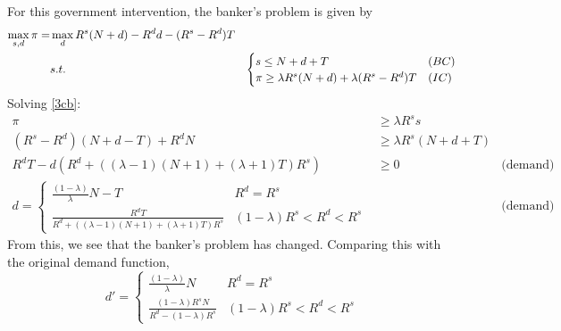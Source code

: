 \documentclass[12pt]{article}
\begin{document}
\begin{enumerate}
\begin{enumerate}
    For this government intervention, the banker's problem is given by 
    \begin{align}
            \max_{s,d}\pi =&\max_{d}  R^s(N+d) - R^dd - (R^s-R^d)T   \label{3cb}
            \\ & s.t. &\begin{cases}
                s \leq N + d + T & (BC)
                \\ \pi \geq \lambda R^s(N+d) + \lambda (R^s - R^d)T & (IC)
            \end{cases}\notag 
    \end{align}
    Solving \eqref{3cb}:
    \begin{align*}
        \pi &\geq \lambda R^ss 
        \\ \left(R^{s}-R^{d}\right)(N+d-T)+R^{d}N &\geq \lambda R^s(N+d+T)
         \\ R^{d}T-d\left(R^{d}+\left((\lambda-1)\left(N+1\right)+\left(\lambda+1\right)T\right)R^{s}\right) &\geq 0 & \text{(demand)}
         \\ d= \begin{cases}
              \frac{(1-\lambda)}{\lambda}N-T & R^d = R^s 
             \\ \frac{R^{d}T}{R^{d}+\left((\lambda-1)\left(N+1\right)+\left(\lambda+1\right)T\right)R^{s}} & (1-\lambda)R^s < R^d < R^s
         \end{cases} && \text{(demand)}
    \end{align*}
    From this, we see that the banker's problem has changed. Comparing this with the original demand function,
    \[d' = \begin{cases}
         \frac{(1-\lambda)}{\lambda}N & R^d = R^s 
             \\ \frac{\left(1-\lambda\right)R^{s}N}{R^{d}-\left(1-\lambda\right)R^{s}} & (1-\lambda)R^s < R^d < R^s

\end{cases}\]
\end{enumerate}
\end{enumerate}
\end{document}
